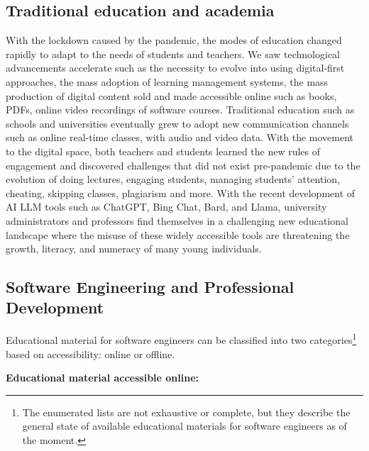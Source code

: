 \documentclass[conference]{IEEEtran}
\begin{document}
\subsection{Traditional education and academia}
With the lockdown caused by the pandemic, the modes of education changed rapidly to 
adapt to the needs of students and teachers. We saw technological advancements 
accelerate such as the necessity to evolve into using digital-first approaches, the
mass adoption of learning management systems, the mass production of digital content 
sold and made accessible online such as books, PDFs, online video recordings of 
software courses. 
Traditional education such as schools and universities eventually grew to adopt 
new communication channels such as online real-time classes, with audio and video data. 
With the movement to the digital space, both teachers and students learned the new 
rules of engagement and discovered challenges that did not exist pre-pandemic due to
the evolution of doing lectures, engaging students, managing students' attention, 
cheating, skipping classes, plagiarism and more.
With the recent development of AI LLM tools such as ChatGPT, Bing Chat, Bard, and 
Llama, university administrators and professors find themselves in a challenging
new educational landscape where the misuse of these widely accessible tools are 
threatening the growth, literacy, and numeracy of many young individuals.

\subsection{Software Engineering and Professional Development}

Educational material for software engineers can be classified into two categories\footnote{
The enumerated lists are not exhaustive or complete, but they describe the general
state of available educational materials for software engineers as of the moment.} based on accessibility: online or offline.

\textbf{Educational material accessible online:}
\end{document}
